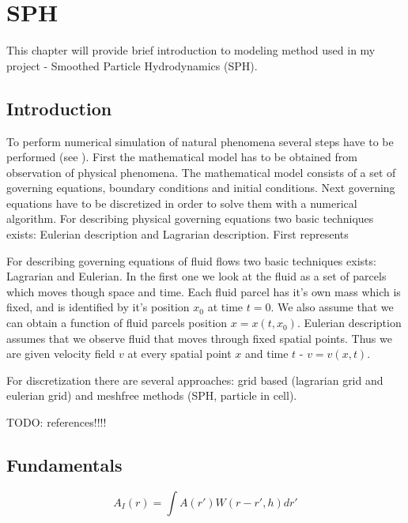 

\chapter{SPH}


\graphicspath{{sph/figures/}}

This chapter will provide brief introduction to modeling method used in my project - Smoothed Particle Hydrodynamics (SPH).

\section{Introduction}
To perform numerical simulation of natural phenomena several steps have to be performed (see \cite[section 1.1.2]{Liu}). First the mathematical model has to be obtained from observation of physical phenomena. The mathematical model consists of a set of governing equations, boundary conditions and initial conditions. Next governing equations have to be discretized in order to solve them with a numerical algorithm.
For describing physical governing equations two basic techniques exists: Eulerian description and Lagrarian description. First represents 

For describing governing equations of fluid flows two basic techniques exists: Lagrarian and Eulerian. In the first one we look at the fluid as a set of parcels which moves though space and time. Each fluid parcel has it's own mass which is fixed, and is identified by it's position $x_0$ at time $t = 0$. We also assume that we can obtain a function of fluid parcels position $x = x(t, x_0)$. 
Eulerian description assumes that we observe fluid that moves through fixed spatial points. Thus we are given velocity field $v$ at every spatial point $x$ and time $t$ - $v = v(x, t)$. 

For discretization there are several approaches: grid based (lagrarian grid and eulerian grid) and meshfree methods (SPH, particle in cell).

TODO: references!!!!

\section{Fundamentals}

\begin{equation}
\label{eq:sph_interpolant}
A_I(r) = \int A(r')W(r - r', h)dr'
\end{equation}

